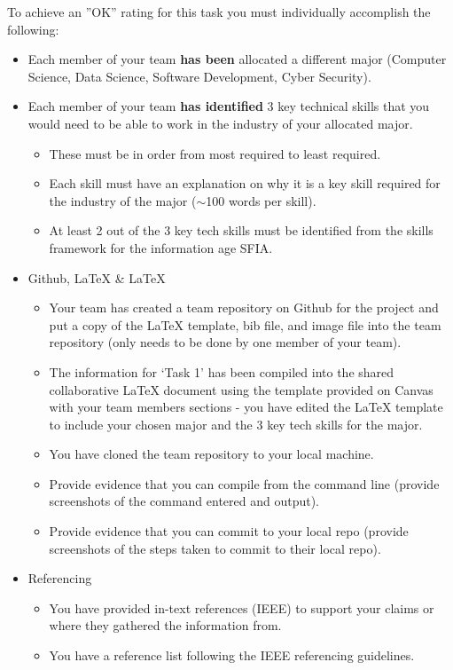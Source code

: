\documentclass[a4paper, 11pt]{report}
\begin{document}
To achieve an ''OK'' rating for this task you must individually accomplish the following:
\begin{itemize}
\item Each member of your team \textbf{has been} allocated a different major (Computer Science, Data Science, Software Development, Cyber Security). 
\item Each member of your team \textbf{has identified} 3 key technical skills that you would need to be able to work in the industry of your allocated major.
	\begin{itemize}
	\item These must be in order from most required to least required.
	\item Each skill must have an explanation on why it is a key skill required for the industry of the major ($\sim$100 words per skill).
	\item At least 2 out of the 3 key tech skills must be identified from the skills framework for the information age SFIA.
	\end{itemize}
\item Github, LaTeX \& LaTeX
	\begin{itemize}
	\item Your team has created a team repository on Github for the project and put a copy of the LaTeX template, bib file, and image file into the team repository (only needs to be done by one member of your team).
	\item The information for ‘Task 1’ has been compiled into the shared collaborative LaTeX document using the template provided on Canvas with your team members sections - you have edited the LaTeX template to include your chosen major and the 3 key tech skills for the major.
	\item You have cloned the team repository to your local machine.
	\item Provide evidence that you can compile from the command line (provide screenshots of the command entered and output).
	\item Provide evidence that you can commit to your local repo (provide screenshots of the steps taken to commit to their local repo).
	\end{itemize}
\item Referencing
	\begin{itemize}
	\item You have provided in-text references (IEEE) to support your claims or where they gathered the information from.
	\item You have a reference list following the IEEE referencing guidelines.

\end{itemize}
\end{itemize}
\end{document}
